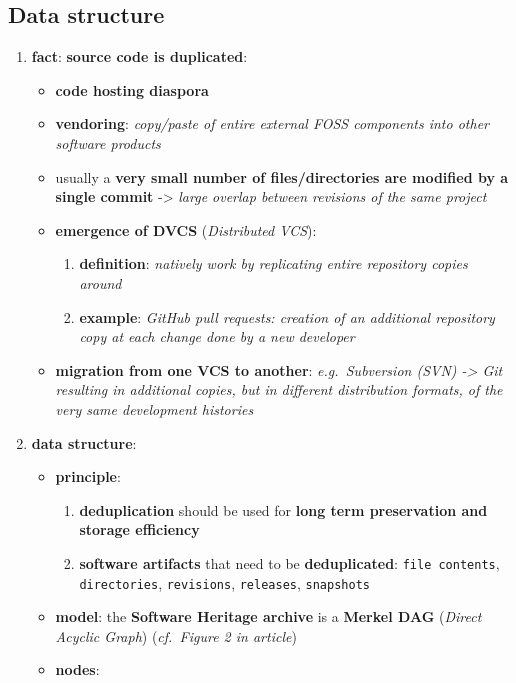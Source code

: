 \documentclass[11pt]{article}
\providecommand{\tightlist}{%
      \setlength{\itemsep}{0pt}\setlength{\parskip}{0pt}}
\begin{document}
\hypertarget{data-structure}{%
\subsection{Data structure}\label{data-structure}}

\begin{enumerate}
\def\labelenumi{\arabic{enumi}.}
\tightlist
\item
  \textbf{fact}: \textbf{source code is duplicated}:

  \begin{itemize}
  \tightlist
  \item
    \textbf{code hosting diaspora}
  \item
    \textbf{vendoring}: \emph{copy/paste of entire external FOSS
    components into other software products}
  \item
    usually a \textbf{very small number of files/directories are
    modified by a single commit} -\textgreater{} \emph{large overlap
    between revisions of the same project}
  \item
    \textbf{emergence of DVCS} (\emph{Distributed VCS}):

    \begin{enumerate}
    \def\labelenumii{\arabic{enumii}.}
    \tightlist
    \item
      \textbf{definition}: \emph{natively work by replicating entire
      repository copies around}
    \item
      \textbf{example}: \emph{GitHub pull requests: creation of an
      additional repository copy at each change done by a new developer}
    \end{enumerate}
  \item
    \textbf{migration from one VCS to another}: \emph{e.g.~Subversion
    (SVN) -\textgreater{} Git resulting in additional copies, but in
    different distribution formats, of the very same development
    histories}
  \end{itemize}
\item
  \textbf{data structure}:

  \begin{itemize}
  \tightlist
  \item
    \textbf{principle}:

    \begin{enumerate}
    \def\labelenumii{\arabic{enumii}.}
    \tightlist
    \item
      \textbf{deduplication} should be used for \textbf{long term
      preservation and storage efficiency}
    \item
      \textbf{software artifacts} that need to be \textbf{deduplicated}:
      \texttt{file\ contents}, \texttt{directories}, \texttt{revisions},
      \texttt{releases}, \texttt{snapshots}
    \end{enumerate}
  \item
    \textbf{model}: the \textbf{Software Heritage archive} is a
    \textbf{Merkel DAG} (\emph{Direct Acyclic Graph}) (\emph{cf.~Figure
    2 in article})
  \item
    \textbf{nodes}:


\end{itemize}
\end{enumerate}
\end{document}
